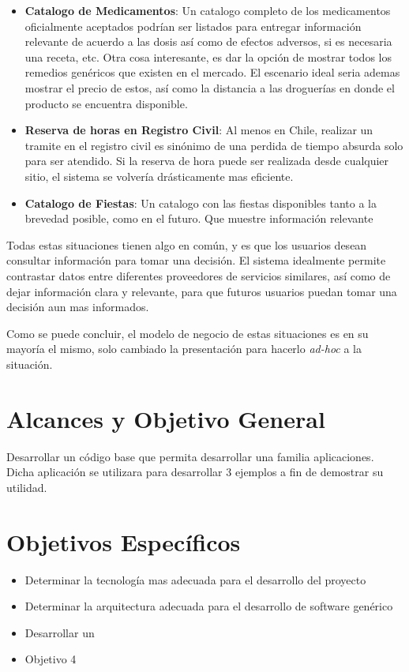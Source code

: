 \begin{itemize}
	\item \textbf{Catalogo de Medicamentos}: Un catalogo completo de los medicamentos oficialmente aceptados podrían ser listados para entregar información relevante de acuerdo a las dosis así como de efectos adversos, si es necesaria una receta, etc. Otra cosa interesante, es dar la opción de mostrar todos los remedios genéricos que existen en el mercado. El escenario ideal seria ademas mostrar el precio de estos, así como la distancia a las droguerías en donde el producto se encuentra disponible.
	
	\item \textbf{Reserva de horas en Registro Civil}: Al menos en Chile, realizar un tramite en el registro civil es sinónimo de una perdida de tiempo absurda solo para ser atendido. Si la reserva de hora puede ser realizada desde cualquier sitio, el sistema se volvería drásticamente mas eficiente.
	
	\item \textbf{Catalogo de Fiestas}: Un catalogo con las fiestas disponibles tanto a la brevedad posible, como en el futuro. Que muestre información relevante 
	
\end{itemize}

Todas estas situaciones tienen algo en común, y es que los usuarios desean consultar información para tomar una decisión. El sistema idealmente permite contrastar datos entre diferentes proveedores de servicios similares, así como de dejar información clara y relevante, para que futuros usuarios puedan tomar una decisión aun mas informados.

Como se puede concluir, el modelo de negocio de estas situaciones es en su mayoría el mismo, solo cambiado la presentación para hacerlo \textit{ad-hoc} a la situación.

\section{Alcances y Objetivo General}\label{cap:intro:alcances}
Desarrollar un código base que permita desarrollar una familia aplicaciones. Dicha aplicación se utilizara para desarrollar 3 ejemplos a fin de demostrar su utilidad.

\section{Objetivos Específicos}\label{cap:intro:objetivos}
\begin{itemize}
	\item Determinar la tecnología mas adecuada para el desarrollo del proyecto
	\item Determinar la arquitectura adecuada para el desarrollo de software genérico
	\item Desarrollar un \ecommerce
	\item Objetivo 4
\end{itemize}

